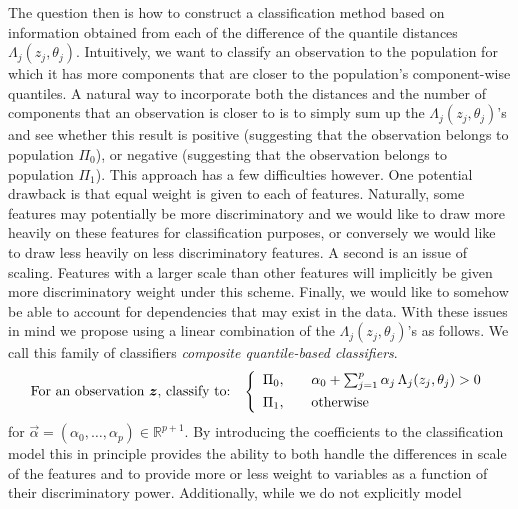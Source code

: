 The question then is how to construct a classification method based on
information obtained from each of the difference of the quantile distances
$\Lambda_j(z_j, \theta_j)$.  Intuitively, we want to classify an observation to
the population for which it has more components that are closer to the
population's component-wise quantiles.  A natural way to incorporate both the
distances and the number of components that an observation is closer to is to
simply sum up the $\Lambda_j(z_j, \theta_j)$'s and see whether this result is
positive (suggesting that the observation belongs to population $\Pi_0$), or
negative (suggesting that the observation belongs to population $\Pi_1$).  This
approach has a few difficulties however.  One potential drawback is that equal
weight is given to each of features.  Naturally, some features may potentially
be more discriminatory and we would like to draw more heavily on these features
for classification purposes, or conversely we would like to draw less heavily on
less discriminatory features.  A second is an issue of scaling.  Features with a
larger scale than other features will implicitly be given more discriminatory
weight under this scheme.  Finally, we would like to somehow be able to account
for dependencies that may exist in the data.  With these issues in mind we
propose using a linear combination of the $\Lambda_j(z_j, \theta_j)$'s as
follows.  We call this family of classifiers \emph{composite quantile-based
  classifiers}.
\begin{equation}
  \label{eq:composite-classifier}
  \text{For an observation $\vec{z}$, classify to:} \hspace{3mm}
  \left\{
    \begin{array}{lll}
      \Pi_0, & & %
                 \alpha_0 + \sum_{j=1}^p \alpha_j \,
                 \Lambda_j (z_j, \theta_j) > 0 \\[1ex]
      \Pi_1, & & \text{otherwise}
    \end{array}
  \right.
\end{equation}
for $\vec{\alpha} = (\alpha_0, \dots, \alpha_p) \in \mathbb{R}^{p+1}$. By
introducing the coefficients to the classification model this in principle
provides the ability to both handle the differences in scale of the features and
to provide more or less weight to variables as a function of their
discriminatory power. Additionally, while we do not explicitly model
